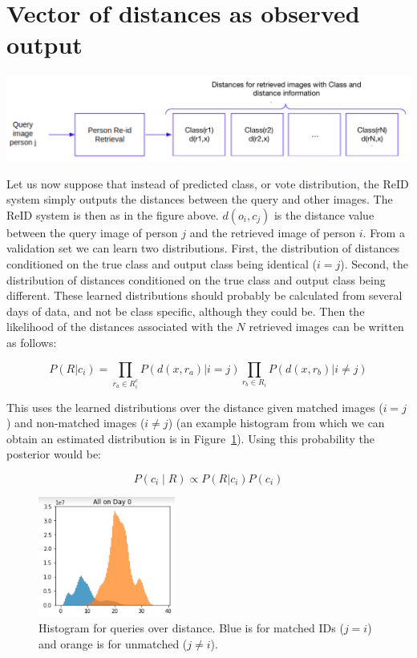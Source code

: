 \documentclass[10pt,a4paper,final]{article}
\begin{document}
\section{Vector of distances as observed output}

\includegraphics[width=\textwidth]{figures/third_idea_new.png}

Let us now suppose that instead of predicted class, or vote distribution, the ReID system simply outputs the distances between the query and other images. The ReID system is then as in the figure above. $d(o_i, c_j)$ is the distance value between the query image of person $j$ and the retrieved image of person $i$. From a validation set we can learn two distributions. First, the distribution of distances conditioned on the true class and output class being identical ($i=j$). Second, the distribution of distances conditioned on the true class and output class being different. These learned distributions should probably be calculated from several days of data, and not be class specific, although they could be. Then the likelihood of the distances associated with the $N$ retrieved images can be written as follows:

\begin{equation}
P(R | c_i) = \prod_{r_a \in R^c_i} P(d(x,r_a)|i=j) \prod_{r_b \in R_i} P(d(x,r_b)|i \neq j)
\end{equation}

This uses the learned distributions over the distance given matched images ($i=j$) and non-matched images ($i \neq j$) (an example histogram from which we can obtain an estimated distribution is in Figure~\ref{fig:dist}). Using this probability the posterior would be:

\begin{equation}
	\label{eq:third_idea}
		P(c_i \mid R) \propto P(R| c_i) P(c_i)
\end{equation}


\begin{figure}
	\centering
	\includegraphics[width=0.40\textwidth]{./figures/match_mismatch_dist.png}
	\caption{Histogram for queries over distance. Blue is for matched IDs ($j = i$) and orange is for unmatched ($j \neq i$).
	\label{fig:dist}}
\end{figure}
\end{document}

